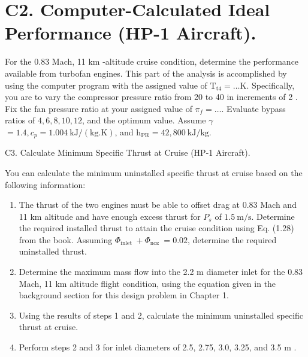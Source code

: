 \documentclass[10pt]{article}
\begin{document}
\section*{C2. Computer-Calculated Ideal Performance (HP-1 Aircraft).}
For the 0.83 Mach, 11 km -altitude cruise condition, determine the performance available from turbofan engines. This part of the analysis is accomplished by using the computer program with the assigned value of $\mathrm{T}_{\mathrm{t} 4}=\ldots \mathrm{K}$. Specifically, you are to vary the compressor pressure ratio from 20 to 40 in increments of 2 . Fix the fan pressure ratio at your assigned value of $\pi_{f}=\ldots$. Evaluate bypass ratios of $4,6,8,10,12$, and the optimum value. Assume $\gamma$ $=1.4, c_{p}=1.004 \mathrm{~kJ} /(\mathrm{kg} . \mathrm{K})$, and $\mathrm{h}_{\mathrm{PR}}=42,800 \mathrm{~kJ} / \mathrm{kg}$.

C3. Calculate Minimum Specific Thrust at Cruise (HP-1 Aircraft).

You can calculate the minimum uninstalled specific thrust at cruise based on the following information:

\begin{enumerate}
  \item The thrust of the two engines must be able to offset drag at 0.83 Mach and 11 km altitude and have enough excess thrust for $P_{s}$ of $1.5 \mathrm{~m} / \mathrm{s}$. Determine the required installed thrust to attain the cruise condition using Eq. (1.28) from the book. Assuming $\Phi_{\text {inlet }}+\Phi_{\text {noz }}=0.02$, determine the required uninstalled thrust.
  \item Determine the maximum mass flow into the 2.2 m diameter inlet for the 0.83 Mach, 11 km altitude flight condition, using the equation given in the background section for this design problem in Chapter 1.
  \item Using the results of steps 1 and 2, calculate the minimum uninstalled specific thrust at cruise.
  \item Perform steps 2 and 3 for inlet diameters of 2.5, 2.75, 3.0, 3.25, and 3.5 m .
\end{enumerate}
\end{document}
